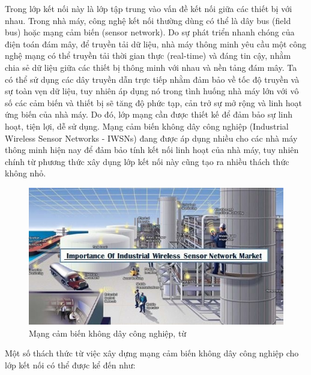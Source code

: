 Trong lớp kết nối này là lớp tập trung vào vấn đề kết nối giữa các thiết bị với nhau. Trong nhà máy, công nghệ kết nối thường dùng có thể là dây bus (field bus) hoặc mạng cảm biến (sensor network). Do sự phát triển nhanh chóng của điện toán đám mây, để truyền tải dữ liệu, nhà máy thông minh yêu cầu một công nghệ mạng có thể truyền tải thời gian thực (real-time) và đáng tin cậy, nhằm chia sẻ dữ liệu giữa các thiết bị thông minh với nhau và nền tảng đám mây. Ta có thể sử dụng các dây truyền dẫn trực tiếp nhằm đảm bảo về tốc độ truyền và sự toàn vẹn dữ liệu, tuy nhiên áp dụng nó trong tình huống nhà máy lớn với vô số các cảm biến và thiết bị sẽ tăng độ phức tạp, cản trở sự mở rộng và linh hoạt ứng biến của nhà máy. Do đó, lớp mạng cần được thiết kế để đảm bảo sự linh hoạt, tiện lợi, dễ sử dụng. Mạng cảm biến không dây công nghiệp (Industrial Wireless Sensor Networks - IWSNs) đang được áp dụng nhiều cho các nhà máy thông minh hiện nay để đảm bảo tính kết nối linh hoạt của nhà máy, tuy nhiên chính từ phương thức xây dụng lớp kết nối này cũng tạo ra nhiều thách thức không nhỏ.

\begin{figure}[!h]
    \centering
    \includegraphics[width=\textwidth]{Images/Intro/sf_2.jpg}
    \caption{Mạng cảm biến không dây công nghiệp, từ \cite{wsnweb}}
    \label{fig:sf_2}
\end{figure}

Một số thách thức từ việc xây dựng mạng cảm biến không dây công nghiệp cho lớp kết nối có thể được kể đến như:

